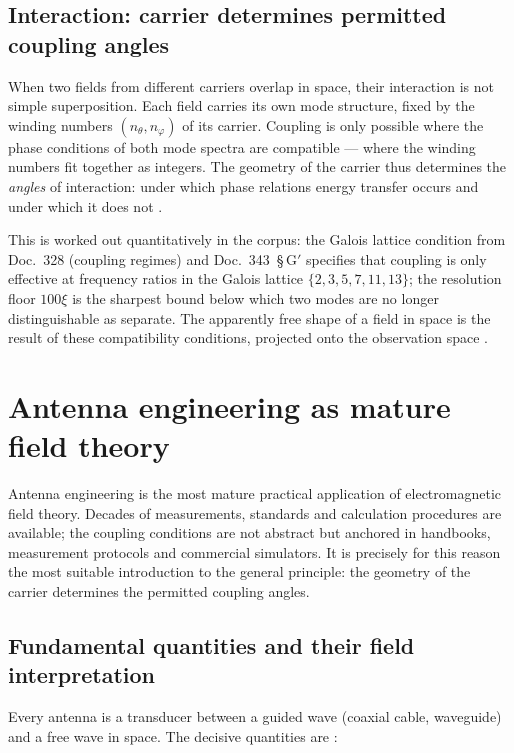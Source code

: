 \subsection*{Interaction: carrier determines permitted coupling angles}

When two fields from different carriers overlap in space, their interaction
is not simple superposition. Each field carries its own mode structure,
fixed by the winding numbers $(n_\theta, n_\varphi)$ of its carrier.
Coupling is only possible where the phase conditions of both mode spectra
are compatible --- where the winding numbers fit together as integers. The
geometry of the carrier thus determines the \emph{angles} of interaction:
under which phase relations energy transfer occurs and under which it does
not \SM.

This is worked out quantitatively in the corpus: the Galois lattice
condition from Doc.~328 (coupling regimes) and Doc.~343~\S\,G$'$ specifies
that coupling is only effective at frequency ratios in the Galois lattice
$\{2,3,5,7,11,13\}$; the resolution floor $100\xi$ is the sharpest bound
below which two modes are no longer distinguishable as separate. The
apparently free shape of a field in space is the result of these
compatibility conditions, projected onto the observation space \SM.

\section{Antenna engineering as mature field theory}

Antenna engineering is the most mature practical application of
electromagnetic field theory. Decades of measurements, standards and
calculation procedures are available; the coupling conditions are not
abstract but anchored in handbooks, measurement protocols and commercial
simulators. It is precisely for this reason the most suitable introduction
to the general principle: the geometry of the carrier determines the
permitted coupling angles.

\subsection*{Fundamental quantities and their field interpretation}

Every antenna is a transducer between a guided wave (coaxial cable,
waveguide) and a free wave in space. The decisive quantities are \EM:

